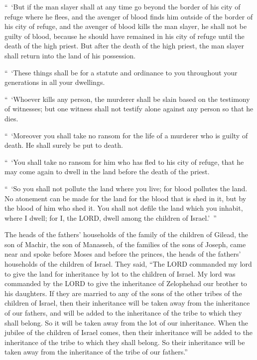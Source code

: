 \myverse{}“ ‘But if the man slayer shall at any time go beyond the border
of his city of refuge where he flees,
\myverse{}and the avenger of blood finds him outside of the border of his city of refuge,
and the avenger of blood kills the man slayer, he shall not be guilty of blood,
\myverse{}because he should have remained in his city of refuge until the death of
the high priest. But after the death of the high priest, the man slayer shall return into the land of
his possession.


\myverse{}“ ‘These things shall be for a statute and ordinance to you throughout
your generations in all your dwellings.


\myverse{}“ ‘Whoever kills any person, the murderer shall be slain based
on the testimony of witnesses; but one witness shall not testify alone against any person so that he dies.


\myverse{}“ ‘Moreover you shall take no ransom for the life of a murderer
who is guilty of death. He shall surely be put to death.


\myverse{}“ ‘You shall take no ransom for him who has fled to his city
of refuge, that he may come again to dwell in the land before the death of the priest.


\myverse{}“ ‘So you shall not pollute the land where you live; for blood
pollutes the land. No atonement can be made for the land for the blood that is shed in it, but by the
blood of him who shed it.
\myverse{}You shall not defile the land which you inhabit, where I dwell; for I, the
LORD, dwell among the children of Israel.’ ”


\mychapter{} \myverse*{}The heads of the fathers’ households of the family of the children
of Gilead, the son of Machir, the son of Manasseh, of the families of the sons of Joseph, came near and
spoke before Moses and before the princes, the heads of the fathers’ households of the children of Israel.
\myverse{}They said, “The LORD commanded my lord to give the land for inheritance by
lot to the children of Israel. My lord was commanded by the LORD to give the inheritance of Zelophehad
our brother to his daughters.
\myverse{}If they are married to any of the sons of the other tribes of the children
of Israel, then their inheritance will be taken away from the inheritance of our fathers, and will be
added to the inheritance of the tribe to which they shall belong. So it will be taken away from the lot
of our inheritance.
\myverse{}When the jubilee of the children of Israel comes, then their inheritance will
be added to the inheritance of the tribe to which they shall belong. So their inheritance will be taken
away from the inheritance of the tribe of our fathers.”


